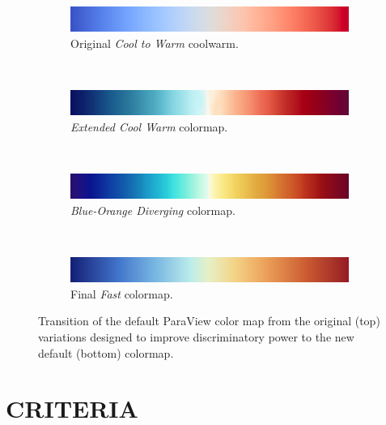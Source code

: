 \documentclass{IEEEcsmag}
\newcommand*{\colormap}[1]{\textsl{#1}\xspace}
\newcommand*{\coolwarm}{\colormap{Cool to Warm}}
\newcommand*{\blueorange}{\colormap{Blue-Orange Diverging}}
\newcommand*{\fast}{\colormap{Fast}}
\newcommand*{\extendedcoolwarm}{\colormap{Extended Cool Warm}}
\begin{document}
\begin{figure}[t]
  \begin{subfigure}{\linewidth}
    \includegraphics[width=\linewidth]{map-cool-to-warm}
    \vspace{-1.4\baselineskip}
    \caption{Original \coolwarm coolwarm.}
    \label{fig:design:coolwarm}
  \end{subfigure}\\[4pt]
  \begin{subfigure}{\linewidth}
    \includegraphics[width=\linewidth]{Final_Pics/CW_extended.png}
    \vspace{-1.4\baselineskip}
    \caption{\extendedcoolwarm colormap.}
    \label{fig:design:cw est}
  \end{subfigure}\\[4pt]
  \begin{subfigure}{\linewidth}
    \includegraphics[width=\linewidth]{map-blue-orange-diverging}
    \vspace{-1.4\baselineskip}
    \caption{\blueorange colormap.}
    \label{fig:design:blueorange}
  \end{subfigure}\\[4pt]
  \begin{subfigure}{\linewidth}
    \includegraphics[width=\linewidth]{map-fast}
    \vspace{-1.4\baselineskip}
    \caption{Final \fast colormap.}
    \label{fig:design:fast}
  \end{subfigure}
  \caption{
    Transition of the default ParaView color map from the original (top) variations designed to improve discriminatory power to the new default (bottom) colormap.
  }
  \label{fig:designs}
\end{figure}

\section{CRITERIA}
\end{document}

